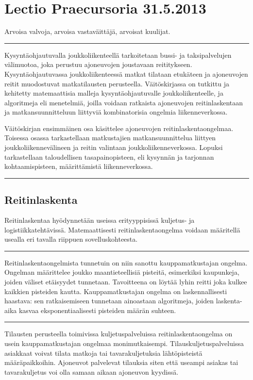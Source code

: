 \documentclass[a4paper,12pt]{article}
\newcommand*\sepline{%
  \begin{center}
    \rule[1ex]{.5\textwidth}{.5pt}
  \end{center}}
\begin{document}
\section*{Lectio Praecursoria 31.5.2013}   %
Arvoisa valvoja, arvoisa vastaväittäjä, arvoisat kuulijat.
\sepline
Kysyntäohjautuvalla joukkoliikenteellä tarkoitetaan bussi- ja taksipalvelujen välimuotoa, joka perustuu %
ajoneuvojen joustavaan reititykseen. Kysyntäohjautuvassa joukkoliikenteessä matkat tilataan etukäteen ja
ajoneuvojen reitit muodostuvat matkatilausten perusteella.
Väitöskirjassa on tutkittu ja kehitetty matemaattisia malleja kysyntäohjautuvalle joukkoliikenteelle, ja algoritmeja eli menetelmiä,
joilla voidaan ratkaista ajoneuvojen reitinlaskentaan ja matkansuunnitteluun liittyviä kombinatorisia ongelmia liikenneverkossa.

Väitöskirjan ensimmäinen osa käsittelee ajoneuvojen reitinlaskentaongelmaa. %
Toisessa osassa tarkastellaan matkustajien matkansuunnittelua liittyen joukkoliikennevälineen ja reitin valintaan joukkoliikenneverkossa.
Lopuksi tarkastellaan taloudellisen tasapainopisteen, eli kysynnän ja tarjonnan kohtaamispisteen, määrittämistä liikenneverkossa.
\sepline
\subsection*{Reitinlaskenta}
Reitinlaskentaa hyödynnetään useissa erityyppisissä kuljetus- ja logistiikkatehtävissä. 
Matemaattisesti reitinlaskentaongelma voidaan määritellä usealla eri tavalla riippuen sovelluskohteesta.
\sepline

Reitinlaskentaongelmista tunnetuin on niin sanottu kauppamatkustajan ongelma. Ongelman määrittelee joukko maantieteellisiä 
pisteitä, esimerkiksi kaupunkeja, joiden väliset etäisyydet tunnetaan. Tavoitteena on löytää lyhin reitti joka kulkee kaikkien pisteiden kautta.
Kauppamatkustajan ongelma on laskennallisesti haastava: sen ratkaisemiseen tunnetaan ainoastaan algoritmeja, joiden laskenta-aika kasvaa 
eksponentiaalisesti pisteiden määrän suhteen.

\sepline

Tilausten perusteella toimivissa kuljetuspalveluissa reitinlaskentaongelma on usein kauppamatkustajan ongelmaa monimutkaisempi. 
Tilauskuljetuspalveluissa asiakkaat voivat tilata matkoja tai tavarakuljetuksia lähtöpisteistä määräpaikkoihin. Ajoneuvot palvelevat 
tilauksia siten että useampi asiakas tai tavarakuljetus voi olla samaan aikaan ajoneuvon kyydissä.
\end{document}

